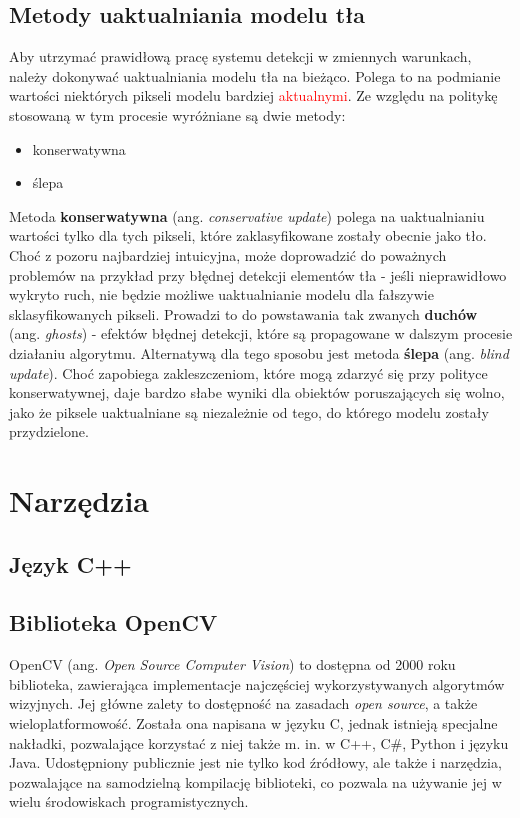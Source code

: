 \subsection{Metody uaktualniania modelu tła}
Aby utrzymać prawidłową pracę systemu detekcji w zmiennych warunkach, należy dokonywać uaktualniania modelu tła na bieżąco. Polega to na podmianie wartości niektórych pikseli modelu bardziej \textcolor{red}{aktualnymi}. Ze względu na politykę stosowaną w tym procesie wyróżniane są dwie metody:
\begin{itemize}
\item konserwatywna
\item ślepa
\end{itemize} 
Metoda \textbf{konserwatywna} (ang. \textit{conservative update}) polega na uaktualnianiu wartości tylko dla tych pikseli, które zaklasyfikowane zostały obecnie jako tło. Choć z pozoru najbardziej intuicyjna, może doprowadzić do poważnych problemów na przykład przy błędnej detekcji elementów tła - jeśli nieprawidłowo wykryto ruch, nie będzie możliwe uaktualnianie modelu dla fałszywie sklasyfikowanych pikseli. Prowadzi to do powstawania tak zwanych \textbf{duchów} (ang. \textit{ghosts}) - efektów błędnej detekcji, które są propagowane w dalszym procesie działaniu algorytmu. Alternatywą dla tego sposobu jest metoda \textbf{ślepa} (ang. \textit{blind update}). Choć zapobiega zakleszczeniom, które mogą zdarzyć się przy polityce konserwatywnej, daje bardzo słabe wyniki dla obiektów poruszających się wolno, jako że piksele uaktualniane są niezależnie od tego, do którego modelu zostały przydzielone.

\section{Narzędzia}
\subsection{Język C++}
\subsection{Biblioteka OpenCV}

OpenCV (ang. \textit{Open Source Computer Vision}) to dostępna od 2000 roku biblioteka, zawierająca implementacje najczęściej wykorzystywanych algorytmów wizyjnych. Jej główne zalety to dostępność na zasadach \textit{open source}, a także wieloplatformowość. Została ona napisana w języku C, jednak istnieją specjalne nakładki, pozwalające korzystać z niej także m. in. w C++, C\#, Python i języku Java. Udostępniony publicznie jest nie tylko kod źródłowy, ale także i narzędzia, pozwalające na samodzielną kompilację biblioteki, co pozwala na używanie jej w wielu środowiskach programistycznych.
